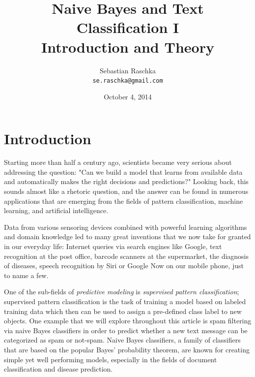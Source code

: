 \documentclass{article}
\title{Naive Bayes and Text Classification I \\ \vspace{2 mm} \large Introduction and Theory}
\author{Sebastian Raschka\\ \texttt{se.raschka@gmail.com}}
\date{October 4, 2014}
\begin{document}

\maketitle %
\tableofcontents



\section{Introduction}
\label{sec:introduction}

Starting more than half a century ago, scientists became very serious about addressing the question: "Can we build a model that learns from available data and automatically makes the right decisions and predictions?" Looking back, this sounds almost like a rhetoric question, and the answer can be found in numerous applications that are emerging from the fields of pattern classification, machine learning, and artificial intelligence.  

Data from various sensoring devices combined with powerful learning algorithms and domain knowledge led to many great inventions that we now take for granted in our everyday life: Internet queries via search engines like Google, text recognition at the post office, barcode scanners at the supermarket, the diagnosis of diseases, speech recognition by Siri or Google Now on our mobile phone, just to name a few.

One of the sub-fields of \emph{predictive modeling} is \emph{supervised pattern classification}; supervised pattern classification is the task of training a model based on labeled training data which then can be used to assign a pre-defined class label to new objects. One example that we will explore throughout this article is spam filtering via naive Bayes classifiers in order to predict whether a new text message can be categorized as spam or not-spam.
Naive Bayes classifiers, a family of classifiers that are based on the popular Bayes' probability theorem, are known for creating simple yet well performing models, especially in the fields of document classification and disease prediction.
\end{document}
